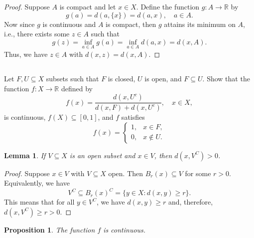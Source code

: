 \documentclass[12pt]{article}
\newenvironment{problem}
    {\begin{lrbox}{\mybox}\begin{minipage}{0.98\textwidth}}
    {\end{minipage}\end{lrbox}\framebox[\textwidth]{\usebox{\mybox}}}
\newtheorem{proposition}{Proposition}
\newtheorem{lemma}{Lemma}
\newcommand{\R}{\mathbb{R}}
\begin{document}
\begin{proof}
    Suppose $A$ is compact and let $x \in X$. Define the function $g : A \to \R$ by
    \[
        g(a) = d(a, \{x\}) = d(a, x), \quad a \in A.
    \]
    Now since $g$ is continuous and $A$ is compact, then $g$ attains its minimum on $A$, i.e., there exists some $z \in A$ such that
    \[
        g(z) = \inf_{a \in A} g(a) = \inf_{a \in A} d(a, x) = d(x, A).
    \]
    Thus, we have $z \in A$ with $d(x, z) = d(x, A)$.
    
    
\end{proof}

\newpage
\subsection{}
\begin{problem}
    Let $F,U\subseteq X$ subsets such that $F$ is closed, $U$ is open, and $F\subseteq U$. Show that the function $f:X\to \R$ defined by 
    \begin{equation}
        f(x) = \frac{d(x,U^c)}{d(x,F) + d(x,U^c)},\quad x\in X,
    \end{equation}
    is continuous, $f(X) \subseteq [0,1]$, and $f$ satisfies 
    \begin{equation}
        f(x) = \left \{ \begin{array}{lr}
            1,& x\in F,\\
            0,& x\notin U. 
        \end{array}\right .
    \end{equation}
\end{problem}

\begin{lemma}
    If $V \subseteq X$ is an open subset and $x \in V$, then $d(x, V^C) > 0$.
\end{lemma}

\begin{proof}
    Suppose $x \in V$ with $V \subseteq X$ open. Then $B_r(x) \subseteq V$ for some $r > 0$. Equivalently, we have
    \[
        V^C \subseteq B_r(x)^C = \{y \in X : d(x, y) \geq r\}.
    \]
    This means that for all $y \in V^C$, we have $d(x, y) \geq r$ and, therefore, $d(x, V^C) \geq r > 0$.
    
\end{proof}

\begin{proposition}
    The function $f$ is continuous.
\end{proposition}
\end{document}
